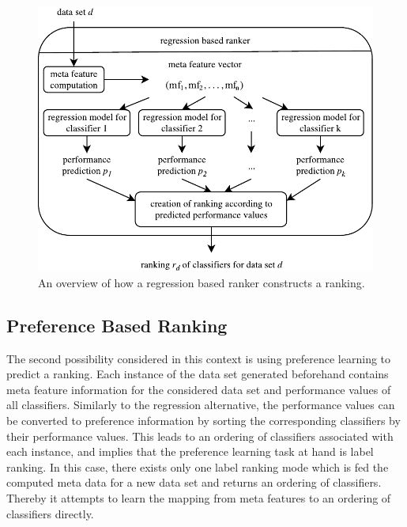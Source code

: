 \begin{figure}
\centering
\includegraphics[scale=1]{gfx/regression_models.pdf}
\caption{An overview of how a regression based ranker constructs a ranking.}
\label{fig:regression_ranker_model}
\end{figure}

\subsection{Preference Based Ranking}
The second possibility considered in this context is using preference learning to predict a ranking. Each instance of the data set generated beforehand contains meta feature information for the considered data set and performance values of all classifiers. Similarly to the regression alternative, the performance values can be converted to preference information by sorting the corresponding classifiers by their performance values. This leads to an ordering of classifiers associated with each instance, and implies that the preference learning task at hand is label ranking. In this case, there exists only one label ranking mode which is fed the computed meta data for a new data set and returns an ordering of classifiers. Thereby it attempts to learn the mapping from meta features to an ordering of classifiers directly.

